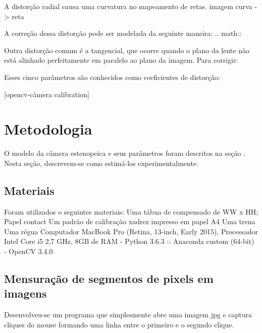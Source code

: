\documentclass[conference]{IEEEtran}
\begin{document}
A distorção radial causa uma curvatura no mapeamento de retas\cite{unicamp}.
imagem curva -> reta

A correção dessa distorção pode ser modelada da seguinte maneira: 
.. math::


Outra distorção comum é a tangencial, que ocorre quando o plano da lente não está alinhado perfeitamente em paralelo ao plano da imagem. Para corrigir:




Esses cinco parâmetros são conhecidos como coeficientes de distorção:



[opencv-câmera calibration]
\section{Metodologia}
O modelo da câmera estenopeica e seus parâmetros foram descritos na seção . Nesta seção, descrevem-se como estimá-los experimentalmente.

\subsection{Materiais}
Foram utilizados o seguintes materiais:
Uma tábua de compensado de WW x HH;
Papel contact
Um padrão de calibração xadrez impresso em papel A4
Uma trena
Uma régua
Computador MacBook Pro (Retina, 13-inch, Early 2015), Processador Intel Core i5 2,7 GHz, 8GB de RAM
- Python 3.6.3 :: Anaconda custom (64-bit)
- OpenCV 3.4.0

\subsection{Mensuração de segmentos de pixels em imagens}
Desenvolveu-se um programa que simplesmente abre uma imagem jpg e captura cliques do mouse formando uma linha entre o primeiro e o segundo clique. 
\end{document}

